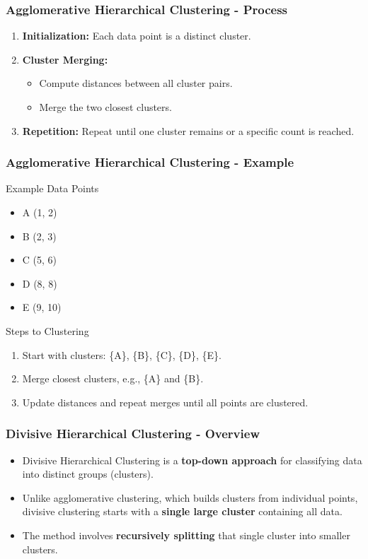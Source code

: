\documentclass[aspectratio=169]{beamer}
\begin{document}
\begin{frame}[fragile]
    \frametitle{Agglomerative Hierarchical Clustering - Process}
    \begin{enumerate}
        \item \textbf{Initialization:} Each data point is a distinct cluster.
        \item \textbf{Cluster Merging:} 
        \begin{itemize}
            \item Compute distances between all cluster pairs.
            \item Merge the two closest clusters.
        \end{itemize}
        \item \textbf{Repetition:} Repeat until one cluster remains or a specific count is reached.
    \end{enumerate}
\end{frame}

\begin{frame}[fragile]
    \frametitle{Agglomerative Hierarchical Clustering - Example}
    \begin{block}{Example Data Points}
        \begin{itemize}
            \item A (1, 2)
            \item B (2, 3)
            \item C (5, 6)
            \item D (8, 8)
            \item E (9, 10)
        \end{itemize}
    \end{block}
    \begin{block}{Steps to Clustering}
        \begin{enumerate}
            \item Start with clusters: \{A\}, \{B\}, \{C\}, \{D\}, \{E\}.
            \item Merge closest clusters, e.g., \{A\} and \{B\}.
            \item Update distances and repeat merges until all points are clustered.
        \end{enumerate}
    \end{block}
\end{frame}

\begin{frame}[fragile]
    \frametitle{Divisive Hierarchical Clustering - Overview}
    \begin{itemize}
        \item Divisive Hierarchical Clustering is a \textbf{top-down approach} for classifying data into distinct groups (clusters).
        \item Unlike agglomerative clustering, which builds clusters from individual points, divisive clustering starts with a \textbf{single large cluster} containing all data.
        \item The method involves \textbf{recursively splitting} that single cluster into smaller clusters.
    \end{itemize}
\end{frame}
\end{document}
